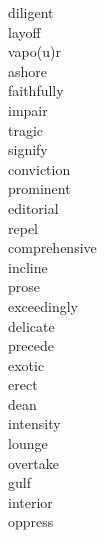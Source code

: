 \documentclass[b5paper, 11pt]{ctexart}
\begin{document}
\begin{multicols*}{3}
\begin{description}
\item[diligent]

\item[layoff]

\item[vapo(u)r]

\item[ashore]

\item[faithfully]

\item[impair]

\item[tragic]

\item[signify]

\item[conviction]

\item[prominent]

\item[editorial]

\item[repel]

\item[comprehensive]

\item[incline]

\item[prose]

\item[exceedingly]

\item[delicate]

\item[precede]

\item[exotic]

\item[erect]

\item[dean]

\item[intensity]

\item[lounge]

\item[overtake]

\item[gulf]

\item[interior]

\item[oppress]


\end{description}
\end{multicols*}
\end{document}

